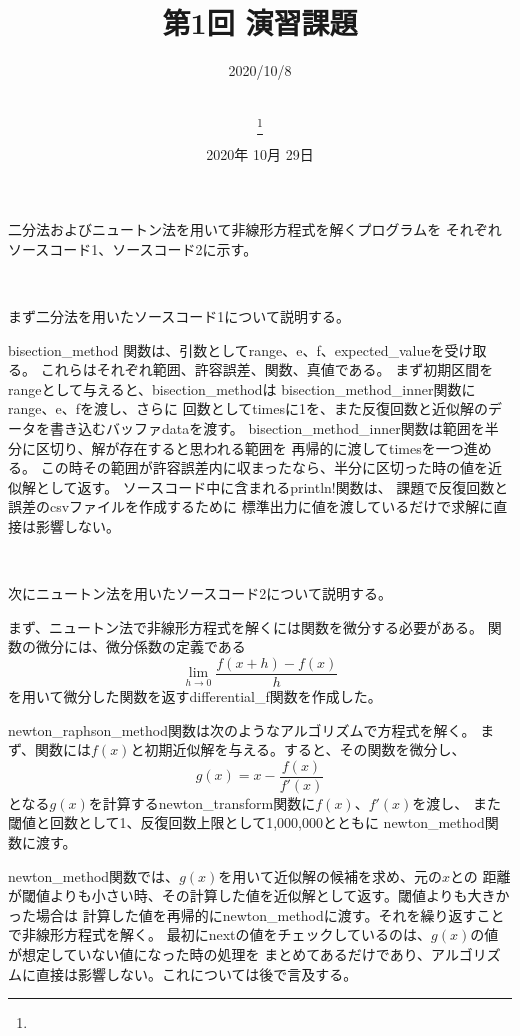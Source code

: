 \documentclass[uplatex, 11pt,a4j, titlepage]{jsarticle}
\title{第1回 演習課題}
\date{2020年 10月 29日}
\author{
    \small{\myid} \\
    \myname\thanks{\mymail}
}
\begin{document}
\maketitle


\subtitle{2020/10/8}


二分法およびニュートン法を用いて非線形方程式を解くプログラムを
それぞれソースコード1、ソースコード2に示す。

\ 

まず二分法を用いたソースコード1について説明する。

bisection\_method 関数は、引数としてrange、e、f、expected_valueを受け取る。
これらはそれぞれ範囲、許容誤差、関数、真値である。
まず初期区間をrangeとして与えると、bisection\_methodは
bisection\_method\_inner関数にrange、e、fを渡し、さらに
回数としてtimesに1を、また反復回数と近似解のデータを書き込むバッファdataを渡す。
bisection\_method\_inner関数は範囲を半分に区切り、解が存在すると思われる範囲を
再帰的に渡してtimesを一つ進める。
この時その範囲が許容誤差内に収まったなら、半分に区切った時の値を近似解として返す。
ソースコード中に含まれるprintln!関数は、
課題で反復回数と誤差のcsvファイルを作成するために
標準出力に値を渡しているだけで求解に直接は影響しない。

\ 

次にニュートン法を用いたソースコード2について説明する。

まず、ニュートン法で非線形方程式を解くには関数を微分する必要がある。
関数の微分には、微分係数の定義である
\begin{equation}
    \lim_{h \to 0} \frac{f(x + h) - f(x)}{h}   
\end{equation}
を用いて微分した関数を返すdifferential\_f関数を作成した。

newton\_raphson\_method関数は次のようなアルゴリズムで方程式を解く。
まず、関数には$f(x)$と初期近似解を与える。すると、その関数を微分し、
\begin{equation}
    g(x) = x - \frac{f(x)}{f'(x)}
\end{equation}
となる$g(x)$を計算するnewton\_transform関数に$f(x)$、$f'(x)$を渡し、
また閾値と回数として1、反復回数上限として1,000,000とともに
newton\_method関数に渡す。

newton\_method関数では、$g(x)$を用いて近似解の候補を求め、元の$x$との
距離が閾値よりも小さい時、その計算した値を近似解として返す。閾値よりも大きかった場合は
計算した値を再帰的にnewton\_methodに渡す。それを繰り返すことで非線形方程式を解く。
最初にnextの値をチェックしているのは、$g(x)$の値が想定していない値になった時の処理を
まとめてあるだけであり、アルゴリズムに直接は影響しない。これについては後で言及する。
\end{document}
